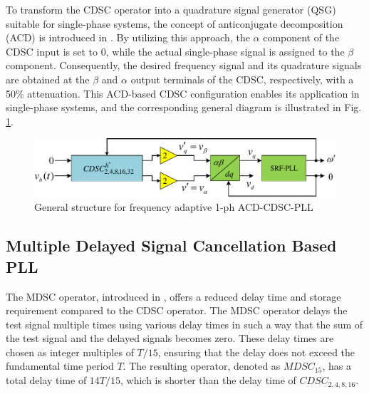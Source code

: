 To transform the CDSC operator into a quadrature signal generator (QSG) suitable for single-phase systems, the concept of anticonjugate decomposition (ACD) is introduced in \cite{6276263}. By utilizing this approach, the $\alpha$ component of the CDSC input is set to $0$, while the actual single-phase signal is assigned to the $\beta$ component. Consequently, the desired frequency signal and its quadrature signals are obtained at the $\beta$ and $\alpha$ output terminals of the CDSC, respectively, with a 50\% attenuation. This ACD-based CDSC configuration enables its application in single-phase systems, and the corresponding general diagram is illustrated in Fig.\,\ref{fig3.8}.
\begin{figure}[h]  
	\centering
	\includegraphics[scale=0.7]{figures/Chapter_3/Mine/ACD-CDSC-PLL.pdf}
	\caption{General structure for frequency adaptive 1-ph ACD-CDSC-PLL}
	\label{fig3.8}
\end{figure} 

\subsection{Multiple Delayed Signal Cancellation Based PLL} 
The MDSC operator, introduced in \cite{8274027}, offers a reduced delay time and storage requirement compared to the CDSC operator. The MDSC operator delays the test signal multiple times using various delay times in such a way that the sum of the test signal and the delayed signals becomes zero. These delay times are chosen as integer multiples of $T/15$, ensuring that the delay does not exceed the fundamental time period $T$. The resulting operator, denoted as $MDSC_{15}$, has a total delay time of $14T/15$, which is shorter than the delay time of $CDSC_{2,4,8,16}$.

